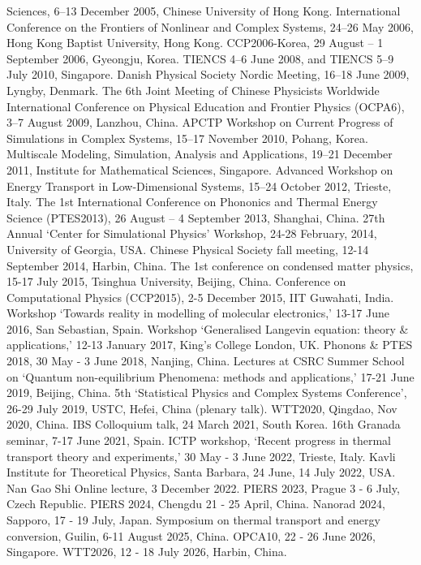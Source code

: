      Sciences, 6--13 December 2005, Chinese University of Hong Kong.
\bul International Conference on the Frontiers of Nonlinear
     and Complex Systems, 24--26 May 2006, Hong Kong Baptist University, 
     Hong Kong.
\bul CCP2006-Korea, 29 August -- 1 September 2006, Gyeongju, Korea. 
\bul TIENCS 4--6 June 2008, and TIENCS 5--9 July 2010, Singapore.
\bul Danish Physical Society Nordic Meeting, 16--18 June 2009, Lyngby,
     Denmark.
\bul The 6th Joint Meeting of Chinese Physicists Worldwide International
     Conference on Physical Education and Frontier Physics (OCPA6),
     3--7 August 2009, Lanzhou, China.
\bul APCTP Workshop on Current Progress of Simulations in Complex Systems,
     15--17 November 2010, Pohang, Korea.
\bul Multiscale Modeling, Simulation, Analysis and Applications, 
     19--21 December 2011, Institute for Mathematical Sciences, Singapore.
\bul Advanced Workshop on Energy Transport in Low-Dimensional Systems,
     15--24 October 2012, Trieste, Italy.
\bul The 1st International Conference on Phononics and Thermal Energy Science
     (PTES2013), 26 August -- 4 September 2013, Shanghai, China.
\bul 27th Annual `Center for Simulational Physics' Workshop, 24-28 February,
     2014, University of Georgia, USA.
\bul Chinese Physical Society fall meeting, 12-14 September 2014, 
     Harbin, China.
\bul The 1st conference on condensed matter physics, 15-17 July 2015, Tsinghua University, Beijing, China.
\bul Conference on Computational Physics (CCP2015), 2-5 December 2015, IIT Guwahati, India.
\bul  Workshop `Towards reality in modelling of molecular electronics,' 13-17 June 2016, 
San Sebastian, Spain.
\bul Workshop `Generalised Langevin equation: theory \& applications,' 
12-13 January 2017, King's College London, UK.
\bul Phonons \& PTES 2018, 30 May - 3 June 2018, Nanjing, China. 
\bul Lectures at CSRC Summer School on `Quantum non-equilibrium Phenomena: methods and applications,' 17-21 June 2019, Beijing, China.
\bul 5th `Statistical Physics and Complex Systems Conference', 26-29 July 2019, USTC, Hefei, China (plenary talk).
\bul WTT2020, Qingdao, Nov 2020, China. 
\bul  IBS Colloquium talk, 24 March 2021, South Korea.
\bul 16th Granada seminar,  7-17 June 2021, Spain.
\bul ICTP workshop, `Recent progress in thermal transport theory and experiments,' 30 May - 3 June 2022, Trieste, Italy.
\bul Kavli Institute for Theoretical Physics, Santa Barbara,  24 June, 14 July 2022, USA.
\bul Nan Gao Shi Online lecture, 3 December 2022. 
\bul PIERS 2023, Prague 3 - 6 July, Czech Republic.
\bul PIERS 2024, Chengdu 21 - 25 April, China.
\bul Nanorad 2024, Sapporo, 17 - 19 July, Japan. 
\bul Symposium on thermal transport and energy conversion, Guilin,  6-11 August 2025, China. 
\bul OPCA10, 22 - 26 June 2026, Singapore.
\bul WTT2026,  12 - 18 July 2026, Harbin, China. 


